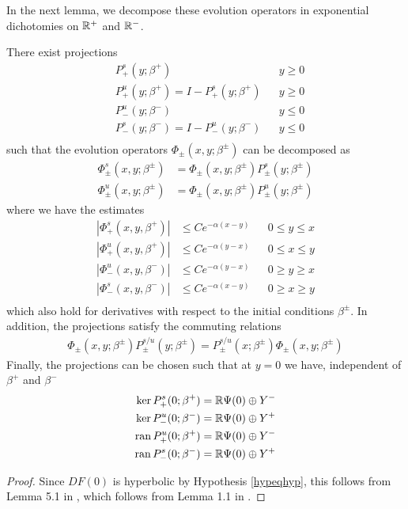 \documentclass[thesis.tex]{subfiles}
\begin{document}
In the next lemma, we decompose these evolution operators in exponential dichotomies on $\mathbb{R}^+$ and $\mathbb{R}^-$. 

\begin{lemma}\label{dichotomy1}
There exist projections
\begin{align*}
&P_+^s(y; \beta^+) && y \geq 0 \\
&P_+^u(y; \beta^+) = I - P_+^s(y; \beta^+) && y \geq 0 \\
&P_-^u(y; \beta^-) && y \leq 0 \\
&P_-^s(y; \beta^-) = I - P_-^u(y; \beta^-) && y \leq 0 \\
\end{align*}
such that the evolution operators $\Phi_\pm(x, y; \beta^\pm)$ can be decomposed as
\begin{align*}
\Phi^s_\pm(x, y; \beta^\pm) &= \Phi_\pm(x, y; \beta^\pm) P^s_\pm(y; \beta^\pm) \\
\Phi^u_\pm(x, y; \beta^\pm) &= \Phi_\pm(x, y; \beta^\pm) P^u_\pm(y; \beta^\pm) 
\end{align*}
where we have the estimates
\begin{align*}
|\Phi^s_+(x, y, \beta^+)| &\leq C e^{-\alpha(x - y)} && 0 \leq y \leq x \\
|\Phi^u_+(x, y, \beta^+)| &\leq C e^{-\alpha(y - x)} && 0 \leq x \leq y \\
|\Phi^u_-(x, y, \beta^-)| &\leq C e^{-\alpha(y - x)} && 0 \geq y \geq x \\
|\Phi^s_-(x, y, \beta^-)| &\leq C e^{-\alpha(x - y)} && 0 \geq x \geq y \\
\end{align*}
which also hold for derivatives with respect to the initial conditions $\beta^\pm$. In addition, the projections satisfy the commuting relations
\begin{align*}
\Phi_\pm(x, y; \beta^\pm) P^{s/u}_\pm(y; \beta^\pm) 
= P^{s/u}_\pm(x; \beta^\pm) \Phi_\pm(x, y; \beta^\pm)
\end{align*}
Finally, the projections can be chosen such that at $y = 0$ we have, independent of $\beta^+$ and $\beta^-$
\begin{align*}
\mathop\mathrm{ker}\nolimits P^s_+(0; \beta^+) &= \mathbb{R} \Psi(0) \oplus Y^- \\
\mathop\mathrm{ker}\nolimits P^u_-(0; \beta^-) &= \mathbb{R} \Psi(0) \oplus Y^+ \\
\operatorname{ran} P^u_+(0; \beta^+) &= \mathbb{R} \Psi(0) \oplus Y^- \\
\operatorname{ran} P^s_-(0; \beta^-) &= \mathbb{R} \Psi(0) \oplus Y^+
\end{align*}

\begin{proof}
Since $DF(0)$ is hyperbolic by Hypothesis \ref{hypeqhyp}, this follows from Lemma 5.1 in \cite{Sandstede1997}, which follows from Lemma 1.1 in \cite{Sandstede1993}.
\end{proof}
\end{lemma}
\end{document}
